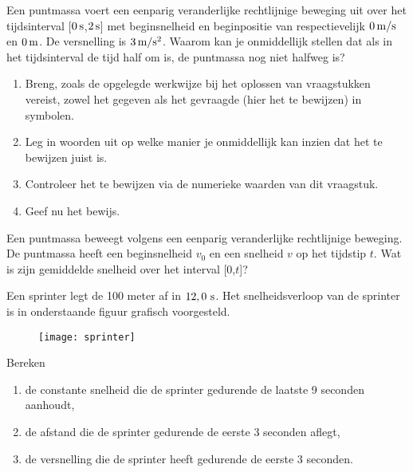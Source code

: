 \begin{exercise} Een puntmassa voert een eenparig veranderlijke rechtlijnige
beweging uit over het tijdsinterval [$0\rm\,s$,$2\rm\,s$] met
beginsnelheid en beginpositie van respectievelijk $0\rm\,m/s$ en
$0\rm\,m$. De versnelling is $3\rm\,m/s^2$. Waarom kan je
onmiddellijk stellen dat als in het tijdsinterval de tijd half om
is, de puntmassa nog niet halfweg is?
\begin{enumerate}
    \item Breng, zoals de opgelegde werkwijze bij het oplossen van
    vraag\-stuk\-ken vereist, zowel het gegeven als het gevraagde (hier
    het te bewijzen) in symbolen.
    \item Leg in woorden uit op welke manier je onmiddellijk kan
    inzien dat het te bewijzen juist is.
    \item Controleer het te bewijzen via de numerieke waarden van
    dit vraagstuk.
    \item Geef nu het bewijs.
\end{enumerate}

\end{exercise}

\begin{exercise} Een puntmassa beweegt volgens een eenparig veranderlijke
rechtlijnige beweging. De puntmassa heeft een beginsnelheid $v_0$ en
een snelheid $v$ op het tijdstip $t$. Wat is zijn gemiddelde
snelheid over het interval [0,$t$]?

\end{exercise}

\begin{exercise} Een sprinter legt de 100 meter af in
$12,0~\rm s$. Het snelheidsverloop van de sprinter is in
onderstaande figuur grafisch voorgesteld.
\begin{figure}[h]
\begin{center}
\texttt{[image: sprinter]}
\end{center}
\end{figure}
\newline
Bereken
\begin{enumerate}
\item de constante snelheid die de sprinter gedurende de laatste 9
seconden aanhoudt,
\item de afstand die de sprinter gedurende de eerste 3 seconden
aflegt,
\item de versnelling die de sprinter heeft gedurende de eerste 3 seconden.
\end{enumerate}

\end{exercise}

